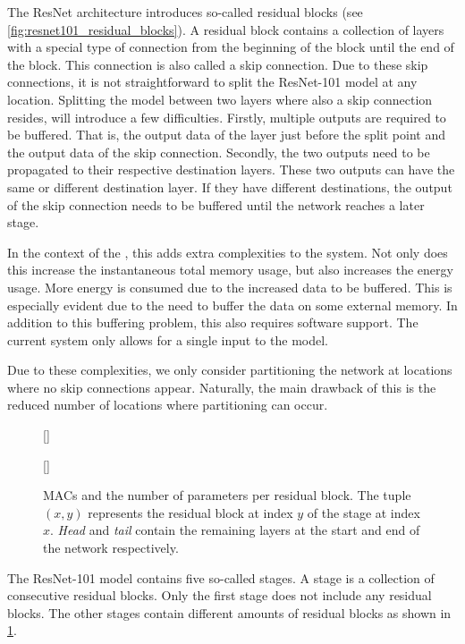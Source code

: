 The ResNet architecture introduces so-called residual blocks (see \cref{fig:resnet101_residual_blocks}).
A residual block contains a collection of layers with a special type of connection from the beginning of the block until the end of the block.
This connection is also called a skip connection.
Due to these skip connections, it is not straightforward to split the ResNet-101 model at any location.
Splitting the model between two layers where also a skip connection resides, will introduce a few difficulties.
Firstly, multiple outputs are required to be buffered.
That is, the output data of the layer just before the split point and the output data of the skip connection.
Secondly, the two outputs need to be propagated to their respective destination layers.
These two outputs can have the same or different destination layer.
If they have different destinations, the output of the skip connection needs to be buffered until the network reaches a later stage.

In the context of the \graicore{}, this adds extra complexities to the system.
Not only does this increase the instantaneous total memory usage, but also increases the energy usage.
More energy is consumed due to the increased data to be buffered.
This is especially evident due to the need to buffer the data on some external memory.
In addition to this buffering problem, this also requires software support.
The current system only allows for a single input to the model. 

Due to these complexities, we only consider partitioning the network at locations where no skip connections appear.
Naturally, the main drawback of this is the reduced number of locations where partitioning can occur.

\begin{figure}[hbtp]
    \centering
    [\textwidth]{
        
    }
    [\textwidth]{
        
    }
    \caption{
        MACs and the number of parameters per residual block.
        The tuple $(x, y)$ represents the residual block at index $y$ of the stage at index $x$.
        \textit{Head} and \textit{tail} contain the remaining layers at the start and end of the network respectively.
    }
    \label{fig:resnet101_stats}
\end{figure}

The ResNet-101 model contains five so-called stages.
A stage is a collection of consecutive residual blocks.
Only the first stage does not include any residual blocks.
The other stages contain different amounts of residual blocks as shown in \cref{fig:resnet101_stats}.

